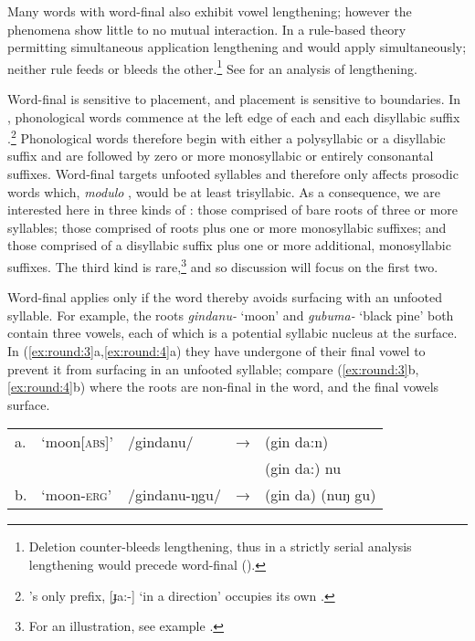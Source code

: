 \documentclass[output=paper,
modfonts
]{LSP/langsci}
\begin{document}
Many words with word-final  also exhibit vowel lengthening; however the phenomena show little to no mutual interaction. In a rule-based theory permitting simultaneous application \citep{anderson1974} lengthening and  would apply simultaneously; neither rule feeds or bleeds the other.\footnote{Deletion counter-bleeds lengthening, thus in a strictly serial analysis lengthening would precede word-final  (\citealt{dixon1977a,dixon1977b,hayes1985,crowhurst1995}).} See \citet{round} for an analysis of  lengthening.

Word-final  is sensitive to  placement, and  placement is sensitive to  boundaries. In , phonological words commence at the left edge of each  and each disyllabic suffix \citep[88--98]{dixon1977a}.\footnote{'s only prefix, [ɟa:-] `in a direction' occupies its own  \citep[98,162]{dixon1977a}.} Phonological words therefore begin with either a polysyllabic  or a disyllabic suffix and are followed by zero or more monosyllabic or entirely consonantal suffixes. Word-final  targets unfooted syllables and therefore only affects prosodic words which, \textit{modulo} , would be at least trisyllabic. As a consequence, we are interested here in three kinds of : those comprised of bare roots of three or more syllables; those comprised of roots plus one or more monosyllabic suffixes; and those comprised of a disyllabic suffix plus one or more additional, monosyllabic suffixes. The third kind is rare,\footnote{For an illustration, see example .} and so discussion will focus on the first two. 

Word-final  applies only if the word thereby avoids surfacing with an unfooted syllable. For example, the roots \textit{gindanu-} `moon' and \textit{gubuma-} `black pine' both contain three vowels, each of which is a potential syllabic nucleus at the surface. In (\ref{ex:round:3}a,\ref{ex:round:4}a) they have undergone  of their final vowel to prevent it from surfacing in an unfooted syllable; compare (\ref{ex:round:3}b,\ref{ex:round:4}b) where the roots are non-final in the word, and the final vowels surface. 

\ea \label{ex:round:3}
\begin{tabular}[t]{@{}lllll}
a. & `moon\textsc{[abs]}' & /gindanu/  & → & (gin da:n) \\

&&&& \ljudge{*}(gin da:) nu \\
b. & `moon\textsc{-erg}' & /gindanu-ŋgu/  & → & (gin da) (nuŋ gu) \\
\end{tabular}
\end{document}
